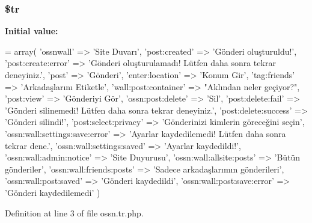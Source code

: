 \subsubsection[{\texorpdfstring{\$tr}{$tr}}]{\setlength{\rightskip}{0pt plus 5cm}\$tr}\hypertarget{components_2_ossn_wall_2locale_2ossn_8tr_8php_a925f466a276b200c71b2567d39b4dba7}{}\label{components_2_ossn_wall_2locale_2ossn_8tr_8php_a925f466a276b200c71b2567d39b4dba7}
{\bfseries Initial value\+:}
\begin{DoxyCode}
= array(
        \textcolor{stringliteral}{'ossnwall'} => \textcolor{stringliteral}{'Site Duvarı'},
        \textcolor{stringliteral}{'post:created'} => \textcolor{stringliteral}{'Gönderi oluşturuldu!'},
        \textcolor{stringliteral}{'post:create:error'} => \textcolor{stringliteral}{'Gönderi oluşturulamadı! Lütfen daha sonra tekrar deneyiniz.'},
        \textcolor{stringliteral}{'post'} => \textcolor{stringliteral}{'Gönderi'},
        \textcolor{stringliteral}{'enter:location'} => \textcolor{stringliteral}{'Konum Gir'},
        \textcolor{stringliteral}{'tag:friends'} => \textcolor{stringliteral}{'Arkadaşlarını Etiketle'},
        \textcolor{stringliteral}{'wall:post:container'} => \textcolor{stringliteral}{"Aklından neler geçiyor?"},
        \textcolor{stringliteral}{'post:view'} => \textcolor{stringliteral}{'Gönderiyi Gör'},
        \textcolor{stringliteral}{'ossn:post:delete'} => \textcolor{stringliteral}{'Sil'},
        \textcolor{stringliteral}{'post:delete:fail'} => \textcolor{stringliteral}{'Gönderi silinemedi! Lütfen daha sonra tekrar deneyiniz.'},
        \textcolor{stringliteral}{'post:delete:success'} => \textcolor{stringliteral}{'Gönderi silindi!'},
        \textcolor{stringliteral}{'post:select:privacy'} => \textcolor{stringliteral}{'Gönderinizi kimlerin göreceğini seçin'},
        \textcolor{stringliteral}{'ossn:wall:settings:save:error'} => \textcolor{stringliteral}{'Ayarlar kaydedilemedi! Lütfen daha sonra tekrar dene.'},
        \textcolor{stringliteral}{'ossn:wall:settings:saved'} => \textcolor{stringliteral}{'Ayarlar kaydedildi!'},
        \textcolor{stringliteral}{'ossn:wall:admin:notice'} => \textcolor{stringliteral}{'Site Duyurusu'},
        \textcolor{stringliteral}{'ossn:wall:allsite:posts'} => \textcolor{stringliteral}{'Bütün gönderiler'},
        \textcolor{stringliteral}{'ossn:wall:friends:posts'} => \textcolor{stringliteral}{'Sadece arkadaşlarımın gönderileri'},
        \textcolor{stringliteral}{'ossn:wall:post:saved'} => \textcolor{stringliteral}{'Gönderi kaydedildi'},
        \textcolor{stringliteral}{'ossn:wall:post:save:error'} => \textcolor{stringliteral}{'Gönderi kaydedilemedi'}
)
\end{DoxyCode}


Definition at line 3 of file ossn.\+tr.\+php.

